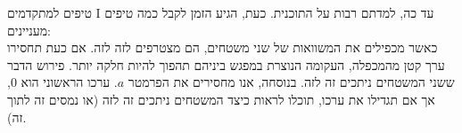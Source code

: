 \begin{surferPage}{טיפים למתקדמים I}
עד כה, למדתם רבות על התוכנית. כעת, הגיע הזמן לקבל כמה טיפים מעניינים:\\
\vspace{0,3cm}
כאשר מכפילים את המשוואות של שני משטחים, הם מצטרפים לזה לזה. אם כעת תחסירו ערך קטן מהמכפלה, העקומה הנוצרת במפגש ביניהם תהפוך להיות חלקה יותר. פירוש הדבר ששני המשטחים ניתכים זה לזה.
\vspace{0,3cm}
בנוסחה, אנו מחסירים את הפרמטר $a$. ערכו הראשוני הוא 0, אך אם תגדילו את ערכו, תוכלו לראות כיצד המשטחים ניתכים זה לזה (או נמסים זה לתוך זה).
\end{surferPage}
